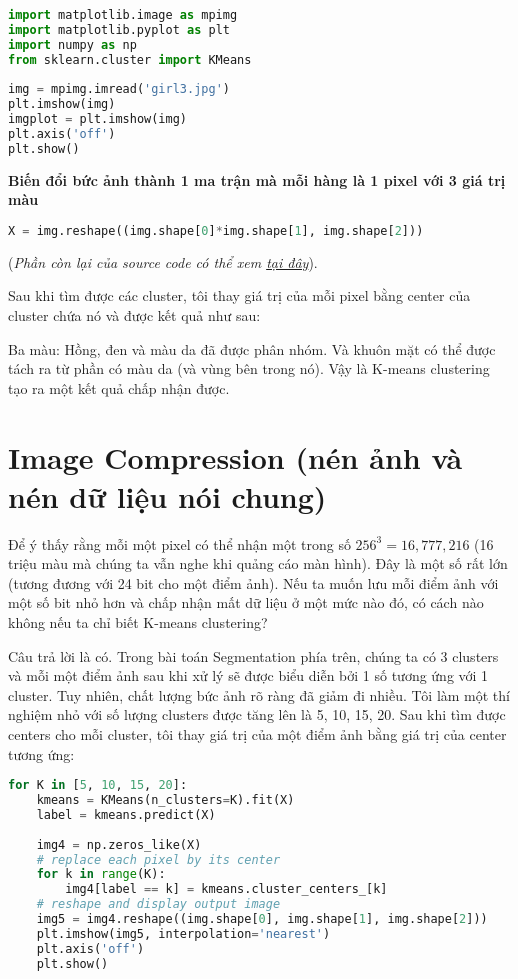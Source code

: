 \begin{lstlisting}[language=Python]
import matplotlib.image as mpimg 
import matplotlib.pyplot as plt 
import numpy as np 
from sklearn.cluster import KMeans 
 
img = mpimg.imread('girl3.jpg') 
plt.imshow(img) 
imgplot = plt.imshow(img) 
plt.axis('off') 
plt.show()  
\end{lstlisting}
 
 
\textbf{Biến đổi bức ảnh thành 1 ma trận mà mỗi hàng là 1 pixel với 3 giá trị màu} 
\begin{lstlisting}[language=Python]
X = img.reshape((img.shape[0]*img.shape[1], img.shape[2])) 
\end{lstlisting}
 
(\textit{Phần còn lại của source code có thể xem \href{https://github.com/tiepvupsu/tiepvupsu.github.io/blob/master/assets/kmeans/Kmeans2.ipynb}{tại đây}}). 
 
Sau khi tìm được các cluster, tôi thay giá trị của mỗi pixel bằng center của cluster chứa nó và được kết quả như sau: 
 
Ba màu: Hồng, đen và màu da đã được phân nhóm. Và khuôn mặt có thể được tách ra từ phần có màu da (và vùng bên trong nó). Vậy là K-means clustering tạo ra một kết quả chấp nhận được. 
 
 
\section{Image Compression (nén ảnh và nén dữ liệu nói chung)}
 
Để ý thấy rằng mỗi một pixel có thể nhận một trong số $256^3 = 16,777,216$ (16 triệu màu mà chúng ta vẫn nghe khi quảng cáo màn hình). Đây là một số rất lớn (tương đương với 24 bit cho một điểm ảnh). Nếu ta muốn lưu mỗi điểm ảnh với một số bit nhỏ hơn và chấp nhận mất dữ liệu ở một mức nào đó, có cách nào không nếu ta chỉ biết K-means clustering? 
 
Câu trả lời là có. Trong bài toán Segmentation phía trên, chúng ta có 3 clusters và mỗi một điểm ảnh sau khi xử lý sẽ được biểu diễn bởi 1 số tương ứng với 1 cluster. Tuy nhiên, chất lượng bức ảnh rõ ràng đã giảm đi nhiều. Tôi làm một thí nghiệm nhỏ với số lượng clusters được tăng lên là 5, 10, 15, 20. Sau khi tìm được centers cho mỗi cluster, tôi thay giá trị của một điểm ảnh bằng giá trị của center tương ứng: 
 
 
\begin{lstlisting}[language=Python]
for K in [5, 10, 15, 20]: 
    kmeans = KMeans(n_clusters=K).fit(X) 
    label = kmeans.predict(X) 
 
    img4 = np.zeros_like(X) 
    # replace each pixel by its center 
    for k in range(K): 
        img4[label == k] = kmeans.cluster_centers_[k] 
    # reshape and display output image 
    img5 = img4.reshape((img.shape[0], img.shape[1], img.shape[2])) 
    plt.imshow(img5, interpolation='nearest') 
    plt.axis('off') 
    plt.show() 
\end{lstlisting}
 
